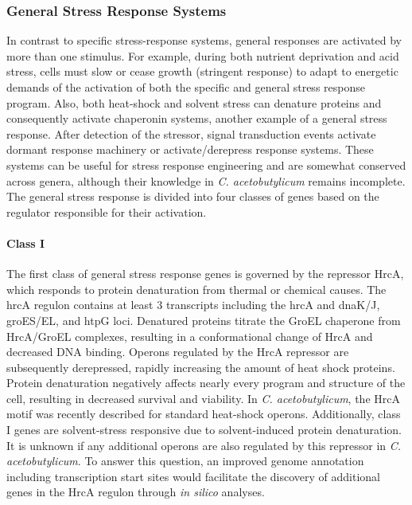 \subsubsection{General Stress Response Systems}

In contrast to specific stress-response systems, general responses are activated by more than one stimulus. For example, during both nutrient deprivation and acid stress, cells must slow or cease growth (stringent response) to adapt to energetic demands of the activation of both the specific and general stress response program. Also, both heat-shock and solvent stress can denature proteins and consequently activate chaperonin systems, another example of a general stress response.\cite{74,75,77} After detection of the stressor, signal transduction events activate dormant response machinery or activate/derepress response systems\cite{77,78}. These systems can be useful for stress response engineering\cite{45,46} and are somewhat conserved across genera, although their knowledge in \textit{C. acetobutylicum} remains incomplete. The general stress response is divided into four classes of genes based on the regulator responsible for their activation. 

\paragraph{Class I}
The first class of general stress response genes is governed by the repressor HrcA, which responds to protein denaturation from thermal or chemical causes. The hrcA regulon contains at least 3 transcripts including the hrcA and dnaK/J, groES/EL, and htpG loci.\cite{42} Denatured proteins titrate the GroEL chaperone from HrcA/GroEL complexes, resulting in a conformational change of HrcA and decreased DNA binding.\cite{77,78} Operons regulated by the HrcA repressor are subsequently derepressed, rapidly increasing the amount of heat shock proteins. Protein denaturation negatively affects nearly every program and structure of the cell, resulting in decreased survival and viability. In \textit{C. acetobutylicum}, the HrcA motif was recently described for standard heat-shock operons.\cite{42} Additionally, class I genes are solvent-stress responsive due to solvent-induced protein denaturation.\cite{74,75} It is unknown if any additional operons are also regulated by this repressor in \textit{C. acetobutylicum}. To answer this question, an improved genome annotation including transcription start sites would facilitate the discovery of additional genes in the HrcA regulon through \textit{in silico} analyses.

